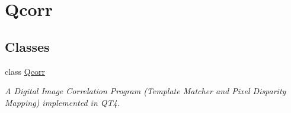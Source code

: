 \hypertarget{group__qcorr__mainwindow}{
\section{Qcorr}
\label{group__qcorr__mainwindow}
}
\subsection*{Classes}
\begin{CompactItemize}
\item 
class \hyperlink{classQcorr}{Qcorr}
\begin{CompactList}\small\item\em A Digital Image Correlation Program (Template Matcher and Pixel Disparity Mapping) implemented in QT4. \item\end{CompactList}\end{CompactItemize}
